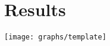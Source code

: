 \section{Results}
\label{results}
\begin{figure*}[htbp]
   \texttt{[image: graphs/template]}
   \label{fig:template}
\end{figure*}
